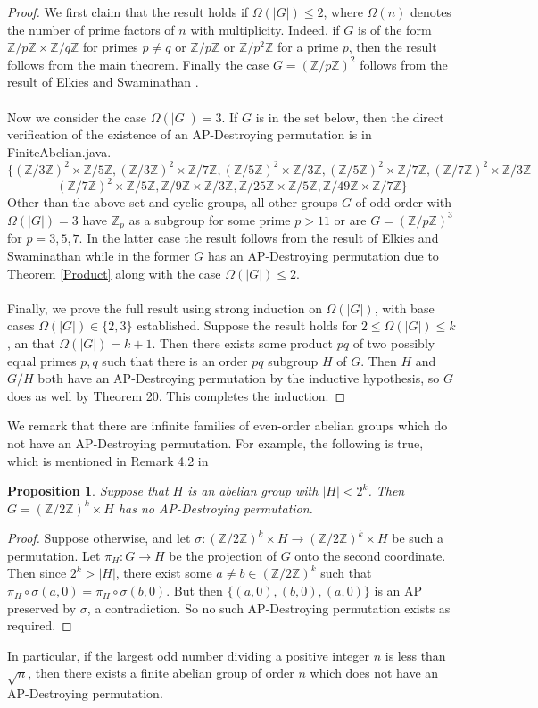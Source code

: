 \documentclass[12pt]{amsart}
\newtheorem{proposition}[thm]{Proposition}
\theoremstyle{definition}
\theoremstyle{remark}
\newcommand{\Z}{\mathbb Z}
\begin{document}
\begin{proof}
We first claim that the result holds if $\Omega(|G|)\le 2$, where $\Omega(n)$ denotes the number of prime factors of $n$ with multiplicity. Indeed, if $G$ is of the form $\Z/p\Z\times \Z/q\Z$ for primes $p\neq q$ or $\Z/p\Z$ or $\Z/p^2\Z$ for a prime $p$, then the result follows from the main theorem. Finally the case $G=(\Z/p\Z)^2$ follows from the result of Elkies and Swaminathan \cite{Ashvin}.
\\
\\ Now we consider the case $\Omega(|G|)=3$. If $G$ is in the set below, then the direct verification of the existence of an AP-Destroying permutation is in FiniteAbelian.java.
\[\{(\Z/3\Z)^2\times \Z/5\Z, (\Z/3\Z)^2\times \Z/7\Z, (\Z/5\Z)^2\times \Z/3\Z, (\Z/5\Z)^2\times \Z/7\Z, (\Z/7\Z)^2\times \Z/3\Z\] \[(\Z/7\Z)^2\times \Z/5\Z,
\Z/9\Z\times \Z/3\Z, \Z/25\Z\times \Z/5\Z, \Z/49\Z\times \Z/7\Z\}\] 
Other than the above set and cyclic groups, all other groups $G$ of odd order with $\Omega(|G|)=3$ have $\Z_p$ as a subgroup for some prime $p>11$ or are $G=(\Z/p\Z)^3$ for $p=3, 5, 7$. In the latter case the result follows from the result of Elkies and Swaminathan \cite{Ashvin} while in the former $G$ has an AP-Destroying permutation due to Theorem \ref{Product} along with the case $\Omega(|G|)\le 2$. 
\\
\\ Finally, we prove the full result using strong induction on $\Omega(|G|)$, with base cases $\Omega(|G|)\in \{2, 3\}$ established. Suppose the result holds for $2\le \Omega(|G|)\le k$, an that $\Omega(|G|)=k+1$. Then there exists some product $pq$ of two possibly equal primes $p, q$ such that there is an order $pq$ subgroup $H$ of $G$. Then $H$ and $G/H$ both have an AP-Destroying permutation by the inductive hypothesis, so $G$ does as well by Theorem 20. This completes the induction.
\end{proof}
We remark that there are infinite families of even-order abelian groups which do not have an AP-Destroying permutation. For example, the following is true, which is mentioned in Remark 4.2 in \cite{hegarty2004permutations}
\begin{proposition}
Suppose that $H$ is an abelian group with $|H|<2^k$. Then $G=(\Z/2\Z)^k\times H$ has no AP-Destroying permutation.  
\end{proposition}
\begin{proof}
Suppose otherwise, and let $\sigma:(\Z/2\Z)^k\times H\to (\Z/2\Z)^k\times H$ be such a permutation. Let $\pi_H: G\to H$ be the projection of $G$ onto the second coordinate. Then since $2^k>|H|$, there exist some $a\neq b\in (\Z/2\Z)^k$ such that $\pi_H\circ \sigma(a, 0)=\pi_H\circ \sigma(b, 0)$. But then $\{(a, 0), (b, 0), (a, 0)\}$ is an AP preserved by $\sigma$, a contradiction. So no such AP-Destroying permutation exists as required. 
\end{proof}
In particular, if the largest odd number dividing a positive integer $n$ is less than $\sqrt{n}$, then there exists a finite abelian group of order $n$ which does not have an AP-Destroying permutation.
\end{document}

